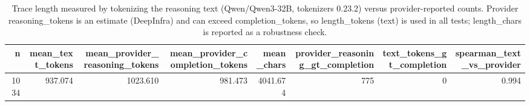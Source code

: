 \begin{table}[htbp]
\caption{Trace length measured by tokenizing the reasoning text (Qwen/Qwen3-32B, tokenizers 0.23.2) versus provider-reported counts. Provider reasoning\_tokens is an estimate (DeepInfra) and can exceed completion\_tokens, so length\_tokens (text) is used in all tests; length\_chars is reported as a robustness check.}
\label{tab:task2_length_validation}
\begin{tabular}{rrrrrrrr}
\toprule
n & mean\_text\_tokens & mean\_provider\_reasoning\_tokens & mean\_provider\_completion\_tokens & mean\_chars & provider\_reasoning\_gt\_completion & text\_tokens\_gt\_completion & spearman\_text\_vs\_provider \\
\midrule
1034 & 937.074 & 1023.610 & 981.473 & 4041.674 & 775 & 0 & 0.994 \\
\bottomrule
\end{tabular}
\end{table}
